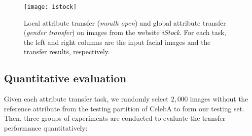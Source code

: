 \documentclass[journal]{IEEEtran}
\begin{document}
\begin{figure*}
\begin{center}
\texttt{[image: istock]}
\end{center}
   \caption{Local attribute transfer (\emph{mouth open}) and global attribute transfer (\emph{gender transfer}) on images from the website \emph{iStock}. For each task, the left and right columns are the input facial images and the transfer results, respectively.}
\label{other}
\end{figure*}


\subsection{Quantitative evaluation}
Given each attribute transfer task, we randomly select $2,000$ images without the reference attribute from the testing partition of CelebA to form our testing set.
Then, three groups of experiments are conducted to evaluate the transfer performance quantitatively:
\end{document}
